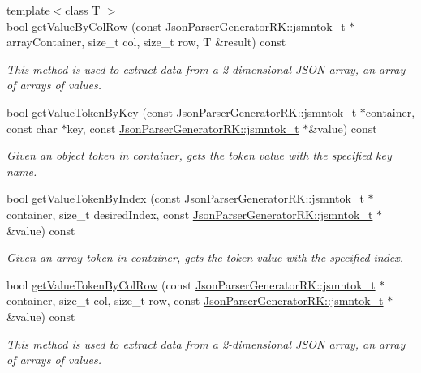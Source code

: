 \begin{DoxyCompactItemize}
{\footnotesize template$<$class T $>$ }\\bool \hyperlink{class_json_parser_af1f4a3a65b5cc9cd19b129c410aa78e0}{get\+Value\+By\+Col\+Row} (const \hyperlink{struct_json_parser_generator_r_k_1_1jsmntok__t}{Json\+Parser\+Generator\+R\+K\+::jsmntok\+\_\+t} $\ast$array\+Container, size\+\_\+t col, size\+\_\+t row, T \&result) const
\begin{DoxyCompactList}\small\item\em This method is used to extract data from a 2-\/dimensional J\+S\+ON array, an array of arrays of values. \end{DoxyCompactList}\item 
bool \hyperlink{class_json_parser_a39d613e94d0d6beafe908159f86bc067}{get\+Value\+Token\+By\+Key} (const \hyperlink{struct_json_parser_generator_r_k_1_1jsmntok__t}{Json\+Parser\+Generator\+R\+K\+::jsmntok\+\_\+t} $\ast$container, const char $\ast$key, const \hyperlink{struct_json_parser_generator_r_k_1_1jsmntok__t}{Json\+Parser\+Generator\+R\+K\+::jsmntok\+\_\+t} $\ast$\&value) const
\begin{DoxyCompactList}\small\item\em Given an object token in container, gets the token value with the specified key name. \end{DoxyCompactList}\item 
bool \hyperlink{class_json_parser_a680846b3e3e3e1d40c27bbb71e080048}{get\+Value\+Token\+By\+Index} (const \hyperlink{struct_json_parser_generator_r_k_1_1jsmntok__t}{Json\+Parser\+Generator\+R\+K\+::jsmntok\+\_\+t} $\ast$container, size\+\_\+t desired\+Index, const \hyperlink{struct_json_parser_generator_r_k_1_1jsmntok__t}{Json\+Parser\+Generator\+R\+K\+::jsmntok\+\_\+t} $\ast$\&value) const
\begin{DoxyCompactList}\small\item\em Given an array token in container, gets the token value with the specified index. \end{DoxyCompactList}\item 
bool \hyperlink{class_json_parser_a4fc494206dd45eba5959ffc2df444a21}{get\+Value\+Token\+By\+Col\+Row} (const \hyperlink{struct_json_parser_generator_r_k_1_1jsmntok__t}{Json\+Parser\+Generator\+R\+K\+::jsmntok\+\_\+t} $\ast$container, size\+\_\+t col, size\+\_\+t row, const \hyperlink{struct_json_parser_generator_r_k_1_1jsmntok__t}{Json\+Parser\+Generator\+R\+K\+::jsmntok\+\_\+t} $\ast$\&value) const
\begin{DoxyCompactList}\small\item\em This method is used to extract data from a 2-\/dimensional J\+S\+ON array, an array of arrays of values. \end{DoxyCompactList}\item 

\end{DoxyCompactItemize}
